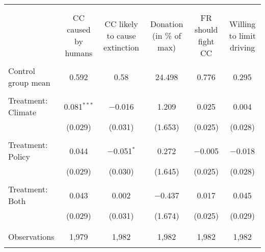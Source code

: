 
\begin{tabular}{@{\extracolsep{5pt}}lccccc} 
\\[-1.8ex]\hline 
\hline \\[-1.8ex] 
\\[-1.8ex] & CC caused by humans & CC likely to cause extinction & Donation (in \% of max) & FR should fight CC & Willing to limit driving \\ 
\hline \\[-1.8ex] 
 Control group mean & 0.592 & 0.58 & 24.498 & 0.776 & 0.295  \\ \hline \\[-1.8ex] Treatment: Climate & 0.081$^{***}$ & $-$0.016 & 1.209 & 0.025 & 0.004 \\ 
  & (0.029) & (0.031) & (1.653) & (0.025) & (0.028) \\ 
  & & & & & \\ 
 Treatment: Policy & 0.044 & $-$0.051$^{*}$ & 0.272 & $-$0.005 & $-$0.018 \\ 
  & (0.029) & (0.030) & (1.645) & (0.025) & (0.028) \\ 
  & & & & & \\ 
 Treatment: Both & 0.043 & 0.002 & $-$0.437 & 0.017 & 0.045 \\ 
  & (0.029) & (0.031) & (1.674) & (0.025) & (0.029) \\ 
  & & & & & \\ 
\hline \\[-1.8ex] 

Observations & 1,979 & 1,982 & 1,982 & 1,982 & 1,982 \\ 
\hline 
\hline \\[-1.8ex] 
\end{tabular} 